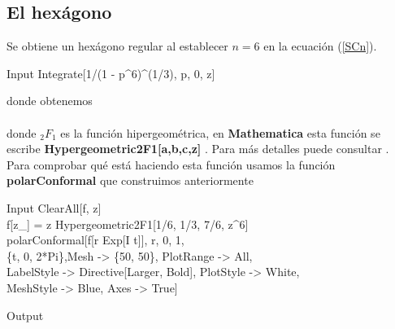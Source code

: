 \subsection{El hexágono}
Se obtiene un hexágono regular al establecer $n = 6$ en la ecuación (\ref{SCn}).
\begin{mmaCell}{Input}
	 Integrate[1/(1 - p^6)^(1/3), {p, 0, z}]
\end{mmaCell} 
\vspace{-0.5 cm}donde obtenemos\\
\\
donde $_2F_1$ es la función hipergeométrica, en \textbf{Mathematica} esta función se escribe \textbf{ Hypergeometric2F1[a,b,c,z] }. Para más detalles puede consultar \cite{Hypergeometric2F1}.\\
Para comprobar qué está haciendo esta función usamos la función \textbf{polarConformal} que construimos anteriormente
\begin{mmaCell}{Input}
	 ClearAll[f, z]\\f[z_] = z Hypergeometric2F1[1/6, 1/3, 7/6, z^6]\\polarConformal[f[r Exp[I t]], {r, 0, 1},\\\{t, 0, 2*Pi\},Mesh -> \{50, 50\}, PlotRange -> All,\\LabelStyle -> Directive[Larger, Bold], PlotStyle -> White,\\MeshStyle -> Blue, Axes -> True]
\end{mmaCell}
\begin{mmaCell}[moregraphics={moreig={scale=0.8}}]{Output}
\end{mmaCell}

